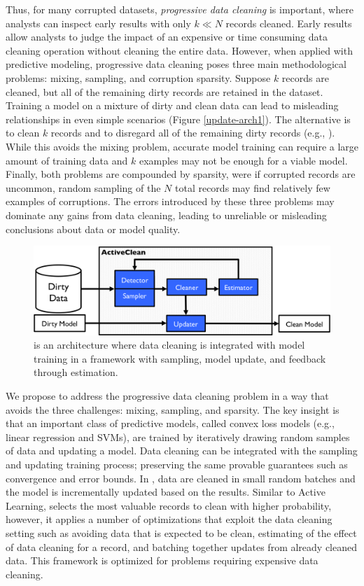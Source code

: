 Thus, for many corrupted datasets, \emph{progressive data cleaning} is important, where analysts can inspect early results with only $k \ll N$ records cleaned.
Early results allow analysts to judge the impact of an expensive or time consuming data cleaning operation without cleaning the entire data.
However, when applied with predictive modeling, progressive data cleaning poses three main methodological problems: mixing, sampling, and corruption sparsity.
Suppose $k$ records are cleaned, but all of the remaining dirty records are retained in the dataset.
Training a model on a mixture of dirty and clean data can lead to misleading relationships in even simple scenarios (Figure \ref{update-arch1}).
The alternative is to clean $k$ records and to disregard all of the remaining dirty records (e.g., \cite{wang1999sample}).
While this avoids the mixing problem, accurate model training can require a large amount of training data and $k$ examples may not be enough for a viable model.
Finally, both problems are compounded by sparsity, were if corrupted records are uncommon, random sampling of the $N$ total records may find relatively few examples of corruptions.
The errors introduced by these three problems may dominate any gains from data cleaning, leading to unreliable or misleading conclusions about data or model quality.

\begin{figure}[t]
\centering
 \includegraphics[width=\columnwidth]{figs/arch.png}
 \caption{\sysfull is an architecture where data cleaning is integrated with model training in a framework with sampling, model update, and feedback through estimation. \label{sys-arch}}\vspace{-2em}
\end{figure}

We propose \sys to address the progressive data cleaning problem in a way that avoids the three challenges: mixing, sampling, and sparsity.
The key insight is that an important class of predictive models, called convex loss models (e.g., linear regression and SVMs), are trained by iteratively drawing random samples of data and updating a model\cite{bertsekas2011incremental}.
Data cleaning can be integrated with the sampling and updating training process; preserving the same provable guarantees such as convergence and error bounds.
In \sys, data are cleaned in small random batches and the model is incrementally updated based on the results.
Similar to Active Learning, \sys selects the most valuable records to clean with higher probability, however, it applies a number of optimizations that exploit the data cleaning setting such as avoiding data that is expected to be clean, estimating of the effect of data cleaning for a record, and batching together updates from already cleaned data.
This framework is optimized for problems requiring expensive data cleaning.

